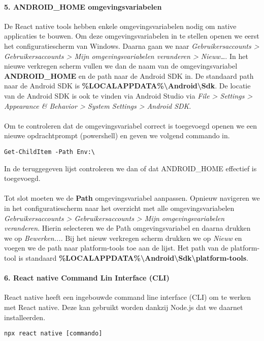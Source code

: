 \paragraph{5. ANDROID\_HOME omgevingsvariabelen}
De React native tools hebben enkele omgevingsvariabelen nodig om native applicaties te bouwen. 
Om deze omgevingsvariabelen in te stellen openen we eerst het configuratiescherm van Windows. 
Daarna gaan we naar 
\textit{Gebruikersaccounts > Gebruikersaccounts > Mijn omgevingsvariabelen veranderen > Nieuw\dots}. 
In het nieuwe verkregen scherm vullen we dan de naam van de omgevingsvariabel \textbf{ANDROID\_HOME} 
en de path naar de Android SDK in. De standaard path naar de Android SDK is 
\textbf{\%LOCALAPPDATA\%\backslash Android\backslash Sdk}. 
De locatie van de Android SDK is ook te vinden via Android Studio via 
\textit{File > Settings > Appearance \& Behavior > System Settings > Android SDK}.
\\\\
Om te controleren dat de omgevingsvariabel correct is toegevoegd openen we een nieuwe 
opdrachtprompt (powershell) en geven we volgend commando in.
\begin{verbatim}
Get-ChildItem -Path Env:\
\end{verbatim}
In de teruggegeven lijst controleren we dan of dat ANDROID\_HOME effectief is toegevoegd.
\\\\
Tot slot moeten we de \textbf{Path} omgevingsvariabel aanpassen. 
Opnieuw navigeren we in het configuratiescherm naar het overzicht met alle omgevingsvariabelen 
\textit{Gebruikersaccounts > Gebruikersaccounts > Mijn omgevingsvariabelen veranderen}. 
Hierin selecteren we de Path omgevingsvariabel en daarna drukken we op \textit{Bewerken...}. 
Bij het nieuw verkregen scherm drukken we op \textit{Nieuw} en voegen we de path naar platform-tools 
toe aan de lijst. Het path van de platform-tool is standaard 
\textbf{\%LOCALAPPDATA\%\backslash Android\backslash Sdk\backslash platform-tools}.

\paragraph{6. React native Command Lin Interface (CLI)}
React native heeft een ingebouwde command line interface (CLI) om te werken met React native. 
Deze kan gebruikt worden dankzij Node.js dat we daarnet installeerden.
\begin{verbatim}
npx react native [commando]
\end{verbatim}

